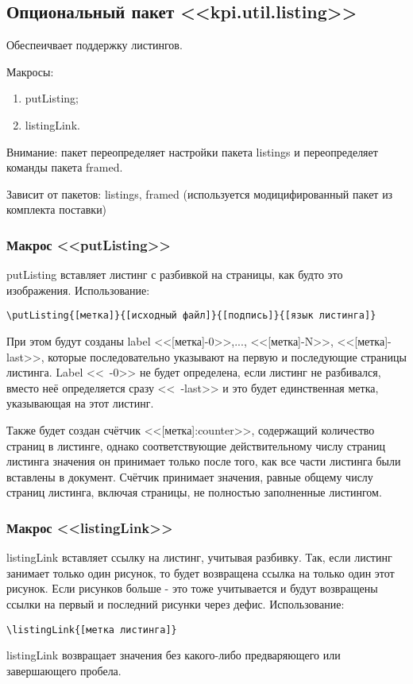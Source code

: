 \subsection{Опциональный пакет <<kpi.util.listing>>}
Обеспеичвает поддержку листингов.\par
Макросы:
\begin{enumerate}
\item putListing;
\item listingLink.
\end{enumerate}\par
Внимание: пакет переопределяет настройки пакета listings и переопределяет команды пакета framed.\par
Зависит от пакетов: listings, framed (используется модицифированный пакет из комплекта поставки)
\subsubsection{Макрос <<putListing>>}
putListing вставляет листинг с разбивкой на страницы, как будто это изображения.
Использование:{\small
\begin{Verbatim}
\putListing{[метка]}{[исходный файл]}{[подпись]}{[язык листинга]}
\end{Verbatim}}
\normalsize
При этом будут созданы label <<[метка]-0>>,..., <<[метка]-N>>, <<[метка]-last>>, которые последовательно указывают на первую и последующие страницы листинга. Label <<~-0>> не будет определена, если листинг не разбивался, вместо неё определяется сразу <<~-last>> и это будет единственная метка, указывающая на этот листинг.\par
Также будет создан счётчик <<[метка]:counter>>, содержащий количество страниц в листинге, однако соответствующие действительному числу страниц листинга значения он принимает только после того, как все части листинга были вставлены в документ. Счётчик принимает значения, равные общему числу страниц листинга, включая страницы, не полностью заполненные листингом.

\subsubsection{Макрос <<listingLink>>}
listingLink вставляет ссылку на листинг, учитывая разбивку. Так, если листинг занимает только один рисунок, то будет возвращена ссылка на только один этот рисунок. Если рисунков больше - это тоже учитывается и будут возвращены ссылки на первый и последний рисунки через дефис.
Использование:{\small
\begin{Verbatim}
\listingLink{[метка листинга]}
\end{Verbatim}}
\normalsize
listingLink возвращает значения без какого-либо предваряющего или завершающего пробела.

